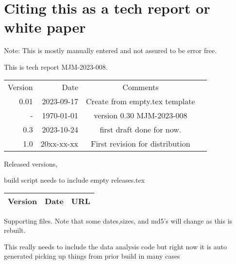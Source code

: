 \documentclass[aps,secnumarabic,balancelastpage,amsmath,amssymb,nofootinbib]{revtex4}
\def\mjmrelease{0.30 }
\newcommand{\mjmversion}{\mjmrelease} %
\newcommand{\mjmtrno}{MJM-2023-008}
\newcommand{\mjmversion}{0.00} %
\newcommand{\mjmtrno}{MJM-2023-008}
\newcommand{\mjmmakedate}{2023-09-17 }
\newcommand{\mjmbasename}{\jobname}
\begin{document}
\section{Citing this as a tech report or white paper }
\label{appendix:citing}

Note: This is mostly manually entered and not assured to be error free.

This is tech report \mjmtrno. 

\begin{table}[H] \centering
\begin{tabular}{r|r|c|r}
Version & Date & Comments  &  \\
0.01 & \mjmmakedate  &  Create from empty.tex template  &  \\
-  & \today & version  \mjmversion { }   \mjmtrno  &  \\
0.3  & 2023-10-24 & first draft done for now.  &  \\
1.0 & 20xx-xx-xx & First revision for distribution &  \\
\end{tabular}
\end{table}


Released versions,

build script needs to include empty releases.tex
\begin{table}[H] \centering
\begin{tabular}{|r|r|l|}
Version & Date & URL    \\
\hline

\hline
\end{tabular}
\end{table}





%

\begin{minipage}{\linewidth}
%
%
\mjmshowbib
\end{minipage}





\vspace{1cm}
Supporting files. Note that some dates,sizes, and md5's will change as this is
rebuilt.

This really needs to include the data analysis code 
but right now it is auto generated picking up things from prior
build in many cases 

\end{document}
